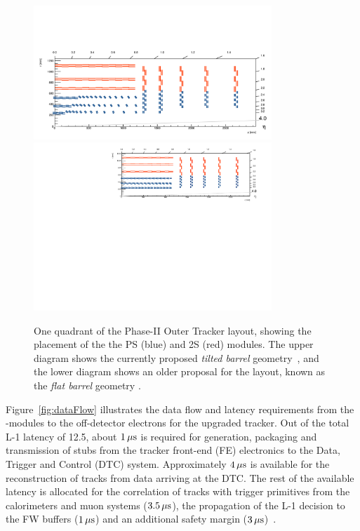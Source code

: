 \begin{figure}[tbp]
\centering
\includegraphics[width=0.8\textwidth,trim={1.1truecm 0truecm 1truecm 12truecm},clip]{figs/tk-upgrade/tiltedbarrelmap.pdf}
\includegraphics[width=0.8\textwidth,trim={0.7truecm 0truecm 1truecm 0truecm},clip]{figs/tk-upgrade/mersilayout.pdf}
\caption{One quadrant of the Phase-II Outer Tracker layout, showing the placement of the the PS (blue) and 2S (red) modules. The upper diagram shows the currently proposed \emph{tilted barrel} geometry~\cite{tiltedGeometry, P2TrackerTDR}, and the lower diagram shows an older proposal for the layout, known as the \emph{flat barrel} geometry \cite{CMS_Upgrade_TP}.}
\label{fig:trackerlayout}
\end{figure}

Figure~\ref{fig:dataFlow} illustrates the data flow and latency requirements from the \pt-modules to the off-detector electrons for the upgraded tracker.
Out of the total L-1 latency of 12.5\mus, about $1\,\mu\text{s}$ is required for generation, packaging and transmission of stubs from the tracker front-end (FE) electronics to the Data, Trigger and Control (DTC) system. 
Approximately $4\,\mu\text{s}$ is available for the reconstruction of tracks from data arriving at the DTC.
The rest of the available latency is allocated for the correlation of tracks with trigger primitives from the calorimeters and muon systems ($3.5\,\mu\text{s}$), the propagation of the L-1 decision to the FW buffers ($1\,\mu\text{s}$) and an additional safety margin ($3\,\mu\text{s}$)~\cite{TMTT_JINST}.


